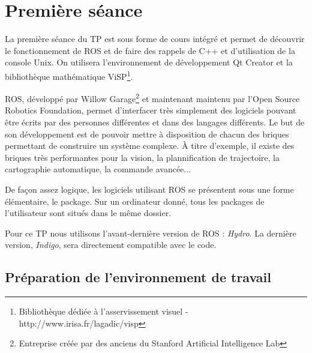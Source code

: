 \documentclass[12pt,a4paper]{article}
\begin{document}
\section{Première séance}

\hspace{12pt}La première séance du TP est sous forme de cours intégré et permet de découvrir le fonctionnement de ROS et de faire des rappels de C++ et d'utilisation de la console Unix. On utilisera l'environnement de développement Qt Creator et la bibliothèque mathématique ViSP\footnote{ Bibliothèque dédiée à l'asservissement visuel - http://www.irisa.fr/lagadic/visp}.

ROS, développé par Willow Garage\footnote{Entreprise créée par des anciens du Stanford Artificial Intelligence Lab} et maintenant maintenu par l'Open Source Robotics Foundation, permet d'interfacer très simplement des logiciels pouvant être écrits par des personnes différentes et dans des langages différents.
Le but de son développement est de pouvoir mettre à disposition de chacun des briques permettant de construire un système complexe.
À titre d'exemple, il existe des briques très performantes pour la vision, la plannification de trajectoire, la cartographie automatique, la commande avancée...

De façon assez logique, les logiciels utilisant ROS se présentent sous une forme élémentaire, le package. Sur un ordinateur donné, tous les packages de l'utilisateur sont situés dans le même dossier.

Pour ce TP nous utilisons l'avant-dernière version de ROS : \emph{Hydro}. La dernière version, \emph{Indigo}, sera directement compatible avec le code.

\subsection{Préparation de l'environnement de travail}

\def\bin{<binôme>}
\def\ros{\url{~}/ros}
\end{document}
